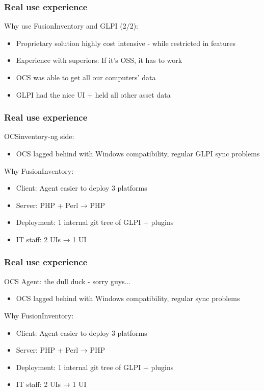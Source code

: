 \documentclass{beamer}
\begin{document}
\begin{frame}
    \frametitle{Real use experience}
    Why use FusionInventory and GLPI (2/2):
    \begin{itemize}
	\item Proprietary solution highly cost intensive - while restricted in features
	\item Experience with superiors: If it's OSS, it has to work
	\item OCS was able to get all our computers' data
	\item GLPI had the nice UI + held all other asset data
    \end{itemize}
\end{frame}

\begin{frame}
    \frametitle{Real use experience}
    OCSinventory-ng side:
    \begin{itemize}
	\item OCS lagged behind with Windows compatibility, regular GLPI sync problems
    \end{itemize}

    Why FusionInventory:
    \begin{itemize}
	\item Client: Agent easier to deploy 3 platforms
	\item Server: PHP + Perl →  PHP
	\item Deployment: 1 internal git tree of GLPI + plugins
	\item IT staff: 2 UIs →  1 UI
    \end{itemize}
\end{frame}

\begin{frame}
    \frametitle{Real use experience}
    OCS Agent: the dull duck - sorry guys...
    \begin{itemize}
	\item OCS lagged behind with Windows compatibility, regular sync problems
    \end{itemize}

    Why FusionInventory:
    \begin{itemize}
	\item Client: Agent easier to deploy 3 platforms
	\item Server: PHP + Perl →  PHP
	\item Deployment: 1 internal git tree of GLPI + plugins
	\item IT staff: 2 UIs →  1 UI
    \end{itemize}
\end{frame}
\end{document}
